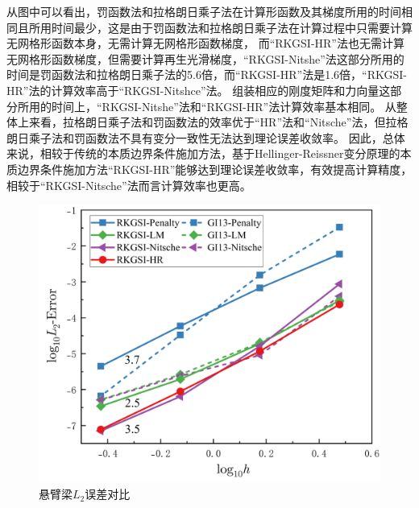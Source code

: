 从图中可以看出，罚函数法和拉格朗日乘子法在计算形函数及其梯度所用的时间相同且所用时间最少，这是由于罚函数法和拉格朗日乘子法在计算过程中只需要计算无网格形函数本身，无需计算无网格形函数梯度，
而“RKGSI-HR”法也无需计算无网格形函数梯度，但需要计算再生光滑梯度，“RKGSI-Nitshe”法这部分所用的时间是罚函数法和拉格朗日乘子法的5.6倍，而“RKGSI-HR”法是1.6倍，“RKGSI-HR”法的计算效率高于“RKGSI-Nitshce”法。
组装相应的刚度矩阵和力向量这部分所用的时间上，“RKGSI-Nitshe”法和“RKGSI-HR”法计算效率基本相同。
从整体上来看，拉格朗日乘子法和罚函数法的效率优于“HR”法和“Nitsche”法，但拉格朗日乘子法和罚函数法不具有变分一致性无法达到理论误差收敛率。
因此，总体来说，相较于传统的本质边界条件施加方法，基于Hellinger-Reissner变分原理的本质边界条件施加方法“RKGSI-HR”能够达到理论误差收敛率，有效提高计算精度，相较于“RKGSI-Nitsche”法而言计算效率也更高。
\begin{figure}[H]
    \centering
    \includegraphics[scale=0.5]{figure/EHR/cantilever/L2.png}
    \caption{悬臂梁$L_2$误差对比}\label{CL2}
\end{figure}
